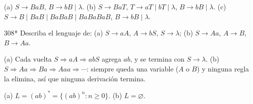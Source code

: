 \documentclass[11pt]{article}
\begin{document}
\resp (a) $S \to BaB$, $B \to bB \mid \lambda$. (b) $S \to BaT$, $T \to aT \mid bT \mid \lambda$, $B \to bB \mid \lambda$. (c) $S \to B \mid BaB \mid BaBaB \mid BaBaBaB$, $B \to bB \mid \lambda$.


\begin{ejercicio}{308}{*}
Describa el lenguaje de: (a) $S \to aA$, $A \to bS$, $S \to \lambda$; (b) $S \to Aa$, $A \to B$, $B \to Aa$.
\end{ejercicio}
\proc (a) Cada vuelta $S \Rightarrow aA \Rightarrow abS$ agrega $ab$, y se termina con $S \to \lambda$. (b) $S \Rightarrow Aa \Rightarrow Ba \Rightarrow Aaa \Rightarrow \cdots$: siempre queda una variable ($A$ o $B$) y ninguna regla la elimina, así que ninguna derivación termina.

\resp (a) $L = (ab)^* = \{(ab)^n : n \ge 0\}$. (b) $L = \varnothing$.
\end{document}
